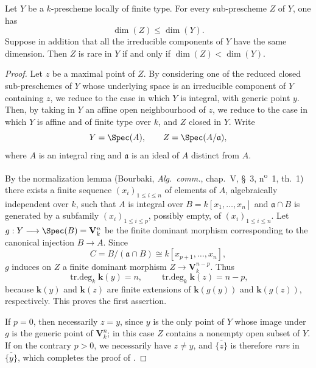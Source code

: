 \begin{corollary}[4.1.2.1]
\label{IV.4.1.2.1}
Let $Y$ be a $k$-prescheme locally of finite type.
For every sub-prescheme $Z$ of $Y$, one has
\[
\dim(Z)\leq\dim(Y).
\]
Suppose in addition that all the irreducible components of $Y$ have the same dimension.
Then $Z$ is rare in $Y$ if and only if $\dim(Z)<\dim(Y)$.
\end{corollary}

\begin{proof}
Let $z$ be a maximal point of $Z$.
By considering one of the reduced closed sub-preschemes of $Y$ whose underlying space is an irreducible component of $Y$ containing $z$, we reduce to the case in which $Y$ is integral, with generic point $y$.
Then, by taking in $Y$ an affine open neighbourhood of $z$, we reduce to the case in which $Y$ is affine and of finite type over $k$, and $Z$ closed in $Y$.
Write
\[
Y=\Spec(A),
\qquad
Z=\Spec(A/\mathfrak a),
\]
where $A$ is an integral ring and $\mathfrak a$ is an ideal of $A$ distinct from $A$.

By the normalization lemma (Bourbaki, \emph{Alg.\ comm.}, chap.~V, \S~3, n\textsuperscript{o}~1, th.~1) there exists a finite sequence $(x_i)_{1\leq i\leq n}$ of elements of $A$, algebraically independent over $k$, such that $A$ is integral over $B=k[x_1,\ldots,x_n]$
and $\mathfrak a\cap B$ is generated by a subfamily $(x_i)_{1\leq i\leq p}$, possibly empty, of $(x_i)_{1\leq i\leq n}$.
Let $g:Y\longrightarrow\Spec(B)=\mathbf{V}_k^n$
be the finite dominant morphism corresponding to the canonical injection $B\to A$.
Since
\[
C=B/(\mathfrak a\cap B)
\cong k[x_{p+1},\ldots,x_n],
\]
$g$ induces on $Z$ a finite dominant morphism $Z\longrightarrow\mathbf{V}_k^{n-p}$.
Thus
\[
\operatorname{tr.deg}_k\boldsymbol{k}(y)=n,
\qquad
\operatorname{tr.deg}_k\boldsymbol{k}(z)=n-p,
\]
because $\boldsymbol{k}(y)$ and $\boldsymbol{k}(z)$ are finite extensions of $\boldsymbol{k}(g(y))$ and $\boldsymbol{k}(g(z))$, respectively.
This proves the first assertion.

If $p=0$, then necessarily $z=y$, since $y$ is the only point of $Y$ whose image under $g$ is the generic point of $\mathbf{V}_k^n$; in this case $Z$ contains a nonempty open subset of $Y$.
If on the contrary $p>0$, we necessarily have $z\neq y$, and $\overline{\{z\}}$ is therefore \emph{rare} in $\overline{\{y\}}$, which completes the proof of .
\end{proof}

